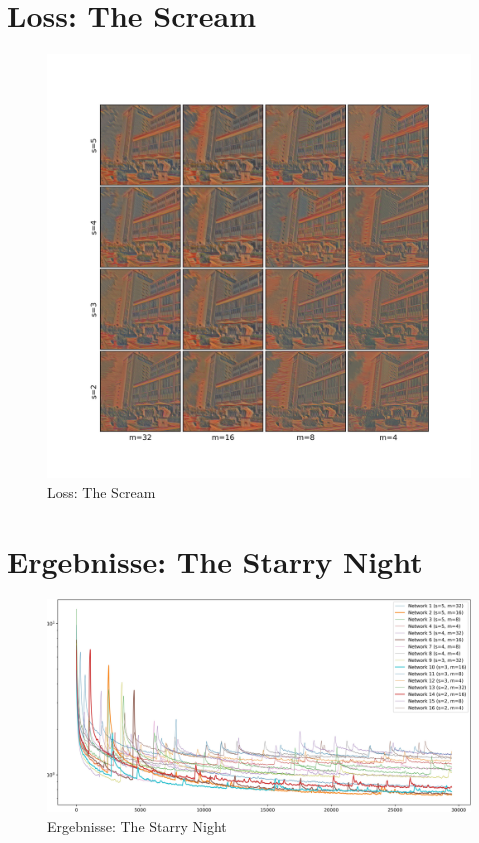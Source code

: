 \section{Loss: The Scream}
\begin{figure}[H]
	\centering
	\includegraphics[width=1.00\textwidth]{resources/content/experiments/fast_image_grid_experiment2.jpg}
	\caption{Loss: The Scream}
	\label{img:loss_the_scream}
\end{figure}

\section{Ergebnisse: The Starry Night}
\begin{figure}[H]
	\centering
	\includegraphics[width=1.00\textwidth]{resources/content/experiments/fast_loss_plot_experiment1.jpg}
	\caption{Ergebnisse: The Starry Night}
	\label{img:results_the_starry_night}
\end{figure}

